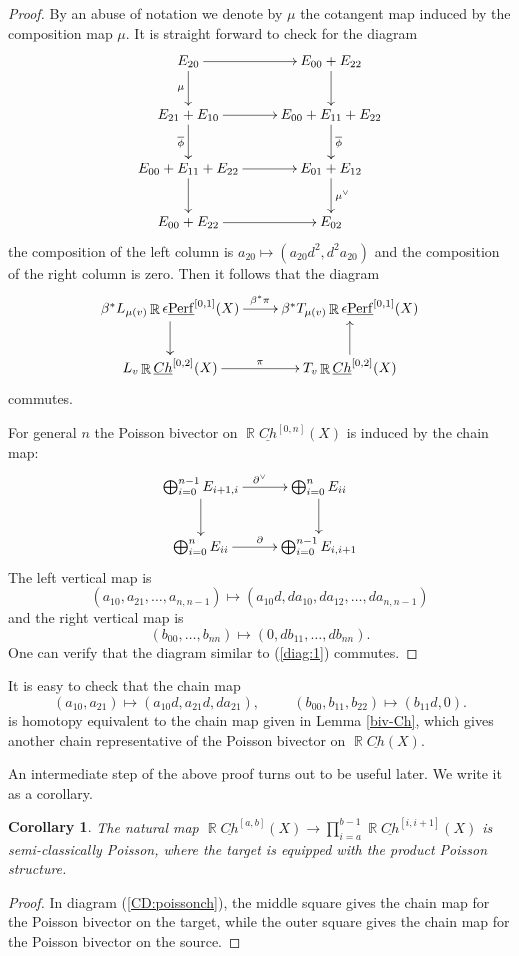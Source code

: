 \documentclass[reqno]{amsart}
\DeclareMathOperator\R{\mathbb R}
\newtheorem{cor}[theorem]{Corollary}
\theoremstyle{definition}
\theoremstyle{remark}
\newcommand{\ul}{\underline}
\newcommand{\eps}{\epsilon}
\newcommand{\uperf}{\ul{\mathrm{Perf}}}
\newcommand{\ol}{\overline}
\newcommand{\uchain}{\underline{Ch}}
\numberwithin{equation}{section}
\begin{document}
\begin{proof}
By an abuse of notation we denote by $\mu$ the cotangent map induced by the composition map $\mu$.
It is straight forward to check for the diagram
\begin{equation}\label{diag:1}
\xymatrix{
E_{20}\ar[d]_\mu\ar[r] & E_{00}+E_{22}\ar[d]\\
E_{21}+E_{10}\ar[r]\ar[d]_{\ol{\phi}}& E_{00}+E_{11}+E_{22}\ar[d]^{\ol{\phi}}\\
E_{00}+E_{11}+E_{22}\ar[r]\ar[d] & E_{01}+E_{12}\ar[d]^{\mu^\vee}\\
E_{00}+E_{22}\ar[r] & E_{02}
}
\end{equation}
the composition of the left column is $a_{20}\mapsto (a_{20}d^2,d^2a_{20})$ and the composition of the right column is zero. Then it follows that the diagram
\[\xymatrix{
\beta^*L_{\mu(v)}\R\eps\uperf^{[0,1]}(X)\ar[r]^{\beta^*\pi} \ar[d]& \beta^*T_{\mu(v)}\R\eps\uperf^{[0,1]}(X) \\
L_v\R\uchain^{[0,2]}(X)\ar[r]^{\pi} &T_v\R\uchain^{[0,2]}(X)\ar[u]
}
\] commutes.

For general $n$ the Poisson bivector on $\R\uchain^{[0,n]}(X)$ is induced by the chain map:
\[\xymatrix{
\bigoplus_{i=0}^{n-1} E_{i+1,i}\ar[r]^{\partial^\vee}\ar[d] & \bigoplus_{i=0}^n E_{ii}\ar[d]\\
\bigoplus_{i=0}^n E_{ii}\ar[r]^{\partial} & \bigoplus_{i=0}^{n-1} E_{i,i+1}
}
\]
The left vertical map is
\[
(a_{10},a_{21},\ldots,a_{n,n-1})\mapsto (a_{10}d, da_{10},da_{12},\ldots, da_{n,n-1})
\] and
the right vertical map is
\[
(b_{00},\ldots,b_{nn})\mapsto (0, db_{11},\ldots, db_{nn}).
\] One can verify that the diagram similar to (\ref{diag:1}) commutes.
\end{proof}

It is easy to check that the chain map
\[
(a_{10},a_{21})\mapsto (a_{10}d,a_{21}d,da_{21}), \hspace{1cm} (b_{00},b_{11},b_{22})\mapsto (b
_{11}d, 0).
\] is homotopy equivalent to the chain map given in Lemma \ref{biv-Ch}, which gives another chain representative of the Poisson bivector on $\R\uchain(X)$.


An intermediate step of the above proof turns out to be useful later. We write it as a corollary.
\begin{cor}\label{cor:fiberprod}
The natural map $\R\uchain^{[a,b]}(X)\to \prod_{i=a}^{b-1} \R\uchain^{[i,i+1]}(X)$ is semi-classically Poisson, where the target is equipped with the product Poisson structure. 
\end{cor}
\begin{proof}
In diagram (\ref{CD:poissonch}), the middle square gives the chain map for the Poisson bivector on the target, while the outer square gives the chain map for the Poisson bivector on the source.  
\end{proof}
\end{document}
